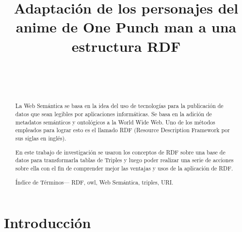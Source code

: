 \documentclass[conference]{IEEEtran}
\begin{document}
\title{\bf{Adaptación de los personajes del anime de One Punch man a una estructura RDF}}


\author{
\\
\and
{}
\\
}

\maketitle

\begin{abstract}

La Web Semántica se basa en la idea del uso de tecnologías  para la publicación de datos que sean legibles por aplicaciones informáticas.
Se basa en la adición de metadatos semánticos y ontológicos a la World Wide Web. Uno de los métodos empleados para lograr esto es el llamado RDF (Resource Description Framework por sus siglas en inglés).

En este trabajo de investigación se usaron los conceptos de RDF sobre una base de datos para transformarla tablas de Triples y luego poder realizar una serie de acciones sobre ella con el fin de comprender mejor las ventajas y usos de la aplicación de RDF.

\vspace{0.2cm}

\'Indice de T\'erminos— RDF, owl, Web Semántica, triples, URI.
    
\end{abstract}

\section{Introducción}
\end{document}
